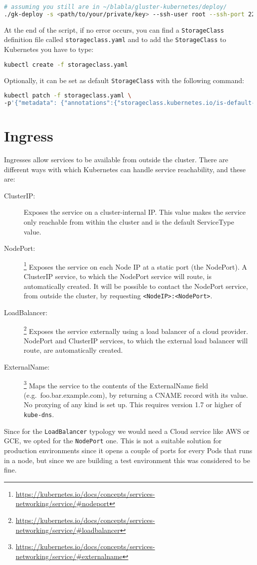 \begin{lstlisting}[language=bash]
# assuming you still are in ~/blabla/gluster-kubernetes/deploy/
./gk-deploy -s <path/to/your/private/key> --ssh-user root --ssh-port 22 topology.json -y
\end{lstlisting}
At the end of the script, if no error occurs, you can find a 
\texttt{StorageClass} definition file called \texttt{storageclass.yaml} and to
add the \texttt{StorageClass} to Kubernetes you have to type:
\begin{lstlisting}[language=bash]
kubectl create -f storageclass.yaml
\end{lstlisting}
Optionally, it can be set as default \texttt{StorageClass} with the following
command:
\begin{lstlisting}[language=bash]
kubectl patch -f storageclass.yaml \
-p'{"metadata": {"annotations":{"storageclass.kubernetes.io/is-default-class":"true"}}}'
\end{lstlisting}

\section{Ingress}
\label{ingress}

Ingresses allow services to be available from outside the cluster. There are 
different ways with which Kubernetes can handle service reachability, and these
are:
\begin{description}
  \item [ClusterIP:] Exposes the service on a cluster-internal IP. This value
    makes the service only reachable from within the cluster and is the default
    ServiceType value.
  \item [NodePort:]
  \footnote{\url{https://kubernetes.io/docs/concepts/services-networking/service/\#nodeport}}
  Exposes the service on each Node IP at a static port (the NodePort). A
  ClusterIP service, to which the NodePort service will route, is automatically
  created. It will be possible to contact the NodePort service, from outside the
  cluster, by requesting
  \texttt{\textless{}NodeIP\textgreater{}:\textless{}NodePort\textgreater{}}.
  \item [LoadBalancer:]
  \footnote{\url{https://kubernetes.io/docs/concepts/services-networking/service/\#loadbalancer}}
  Exposes the service externally using a load balancer of a cloud provider.
  NodePort and ClusterIP services, to which the external load balancer will
  route, are automatically created.
  \item [ExternalName:]
  \footnote{\url{https://kubernetes.io/docs/concepts/services-networking/service/\#externalname}}
  Maps the service to the contents of the ExternalName field
  (e.g.~foo.bar.example.com), by returning a CNAME record with its value. No
  proxying of any kind is set up. This requires version 1.7 or higher of
  \texttt{kube-dns}.
\end{description}
Since for the \texttt{LoadBalancer} typology we would need a Cloud service like 
AWS or GCE, we opted for the \texttt{NodePort} one. This is not a suitable
solution for production environments since it opens a couple of ports for every
Pods that runs in a node, but since we are building a test environment this
was considered to be fine.

